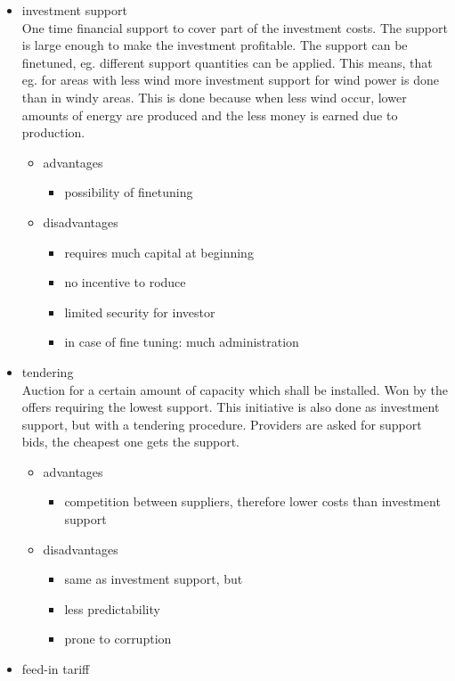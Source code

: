 \documentclass{article}
\begin{document}
\begin{itemize}
\item investment support\\
One time financial support to cover part of the investment costs.  The support is large enough to make the investment profitable. The support can be finetuned, eg. different support quantities can be applied. This means, that eg. for areas with less wind more investment support for wind power is done than in windy areas. This is done because when less wind occur, lower amounts of energy are produced and the less money is earned due to production.
\begin{itemize}
\item advantages
\begin{itemize}
\item possibility of finetuning
\end{itemize}
\item disadvantages
\begin{itemize}
\item requires much capital at beginning
\item no incentive to roduce
\item limited security for investor
\item in case of fine tuning: much administration
\end{itemize}
\end{itemize}
\item tendering\\
Auction for a certain amount of capacity which shall be installed. Won by the offers requiring the lowest support. This initiative is also done as investment support, but with a tendering procedure. Providers are asked for support bids, the cheapest one gets the support.
\begin{itemize}
\item advantages
\begin{itemize}
\item competition between suppliers, therefore lower costs than investment support
\end{itemize}
\item disadvantages
\begin{itemize}
\item same as investment support, but
\item less predictability
\item prone to corruption
\end{itemize}
\end{itemize}
\item feed-in tariff\\

\end{itemize}
\end{document}
